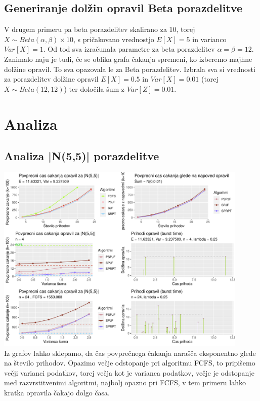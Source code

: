 \documentclass[a4paper, pt14]{article}
\begin{document}
\subsection{Generiranje dolžin opravil Beta porazdelitve}
V drugem primeru pa beta porazdelitev skalirano za 10, torej $X \sim Beta(\alpha, \beta) \times 10 $, s pričakovano vrednostjo $ E[X] = 5$ in varianco $Var[X] = 1 $. Od tod sva izračunala parametre za beta porazdelitev $\alpha = \beta = 12$.\\
Zanimalo naju je tudi, če se oblika grafa čakanja spremeni, ko izberemo majhne dolžine opravil. To sva opazovala le za Beta porazdelitev. Izbrala sva si vrednosti za porazdelitev dolžine opravil $E[X] = 0.5$ in $Var[X] = 0.01 $ (torej $X \sim Beta(12,12)$) ter določila šum z $Var[Z] = 0.01 $.

\section{Analiza}

\subsection{Analiza |N(5,5)| porazdelitve}

\includegraphics[width=12.1cm,keepaspectratio]{Normalna_grafi.pdf}
\\Iz grafov lahko sklepamo, da čas povprečnega čakanja narašča eksponentno glede na število prihodov. Opazimo večje odstopanje pri algoritmu FCFS, to pripišemo večji varianci podatkov, torej večja kot je varianca podatkov, večje je odstopanje med razvrstitvenimi algoritmi, najbolj opazno pri FCFS, v tem primeru lahko kratka opravila čakajo dolgo časa.
\end{document}
